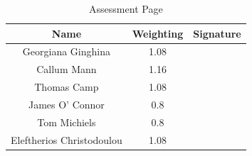 \documentclass[11pt,a4paper]{article}
\begin{document}
\begin{table}
\caption{Assessment Page}
\centering
\begin{tabular}{c c c}
\hline\hline
Name & Weighting & Signature\\ [0.5ex]
\hline
Georgiana Ginghina & 1.08 & \\
Callum Mann & 1.16 & \\
Thomas Camp & 1.08 & \\
James O' Connor & 0.8 & \\
Tom Michiels & 0.8 & \\
Eleftherios Christodoulou & 1.08 & \\

\end{tabular}	
\end{table}
\end{document}
